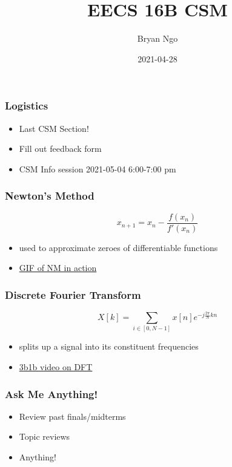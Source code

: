 \documentclass[aspectratio=169]{beamer}
\title{EECS 16B CSM}
\author{Bryan Ngo}
\date{2021-04-28}
\institute{UC Berkeley}
\begin{document}
\begin{frame}
    \maketitle
\end{frame}

\begin{frame}
    \frametitle{Logistics}

    \begin{itemize}
        \item Last CSM Section!
        \item Fill out feedback form
        \item CSM Info session 2021-05-04 6:00-7:00 pm
    \end{itemize}
\end{frame}

\begin{frame}
    \frametitle{Newton's Method}

    \begin{equation}
        x_{n + 1} = x_n - \frac{f(x_n)}{f'(x_n)}
    \end{equation}
    \begin{itemize}
        \item used to approximate zeroes of differentiable functions
        \item \href{https://upload.wikimedia.org/wikipedia/commons/e/e0/NewtonIteration_Ani.gif}{GIF of NM in action}
    \end{itemize}
\end{frame}

\begin{frame}
    \frametitle{Discrete Fourier Transform}

    \begin{equation}
        X[k] = \sum_{i \in [0, N - 1]} x[n] e^{-j \frac{2\pi}{N} k n}
    \end{equation}
    \begin{itemize}
        \item splits up a signal into its constituent frequencies
        \item \href{https://youtu.be/g8RkArhtCc4}{3b1b video on DFT}
    \end{itemize}
\end{frame}

\begin{frame}
    \frametitle{Ask Me Anything!}

    \begin{itemize}
        \item Review past finals/midterms
        \item Topic reviews
        \item Anything!
    \end{itemize}
\end{frame}
\end{document}
